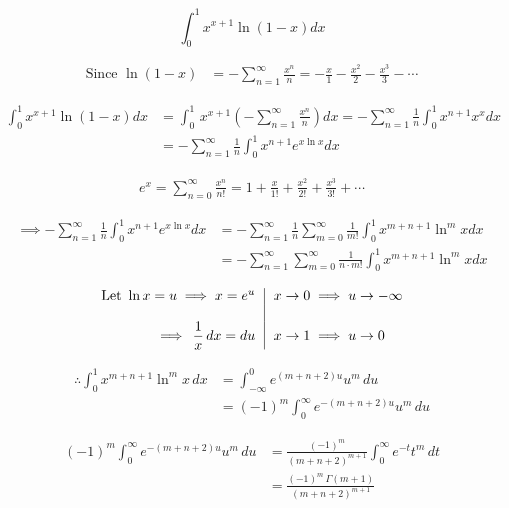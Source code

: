 \documentclass[12pt, a4paper]{article}
\begin{document}
\[
    \int_{0}^{1} x^{x+1} \ln (1-x) dx
\]

\begin{align*}
    \text{Since }
    \ln (1-x) &= - \sum_{n=1}^{\infty} \frac{x^n}{n}
    = - \frac{x}{1} - \frac{x^2}{2} - \frac{x^3}{3} - \cdots
\end{align*}


\begin{align*}
    \int_{0}^{1} x^{x+1} \ln (1-x) dx
    &= \int_{0}^{1}\, x^{x+1} \left( - \sum_{n=1}^{\infty} \frac{x^n}{n} \right) dx
    = - \sum_{n=1}^{\infty} \frac{1}{n} \int_{0}^{1} x^{n+1} x^x dx \\
    &= - \sum_{n=1}^{\infty} \frac{1}{n} \int_{0}^{1} x^{n+1} e^{x \ln x} dx
\end{align*}


\begin{align*}
    e^x = \sum_{n=0}^{\infty} \frac{x^n}{n!} 
    = 1 + \frac{x}{1!} + \frac{x^2}{2!} + \frac{x^3}{3!} + \cdots
\end{align*}

\begin{align*}
    \implies - \sum_{n=1}^{\infty} \frac{1}{n} \int_{0}^{1} x^{n+1} e^{x \ln x} dx
    &= - \sum_{n=1}^{\infty} \frac{1}{n} \sum_{m=0}^{\infty}  \frac{1}{m!} \int_{0}^{1} x^{m+n+1} \ln^m x dx \\
    &= - \sum_{n=1}^{\infty} \sum_{m=0}^{\infty} \frac{1}{n \cdot m!} \int_{0}^{1} x^{m+n+1} \ln^m x dx
\end{align*}

\begin{align*}
    \begin{array}{r | l}
        \text{Let } \ln x = u \implies x = e^u \,
        &\, x \to 0 \implies u \to - \infty\\
        \\\implies \, \dfrac{1}{x} \, dx = du \,
        &\, x \to 1 \implies u \to 0
    \end{array}
\end{align*}

\begin{align*}
    \therefore \int_{0}^{1} x^{m+n+1} \ln^m x \,dx
    &= \int_{- \infty}^{0} e^{(m+n+2)u} u^{m} \, du \\
    &= (-1)^m \int_{0}^{\infty} e^{-(m+n+2)u} u^{m} \, du
\end{align*}

\begin{align*}
    (-1)^m \int_{0}^{\infty} e^{-(m+n+2)u} u^{m} \, du
    &= \frac{(-1)^m}{(m+n+2)^{m+1}} \int_{0}^{\infty} e^{-t} t^{m} \, dt \\
    &= \frac{(-1)^m \, \Gamma (m+1)}{(m+n+2)^{m+1}}\\
\end{align*}
\end{document}
